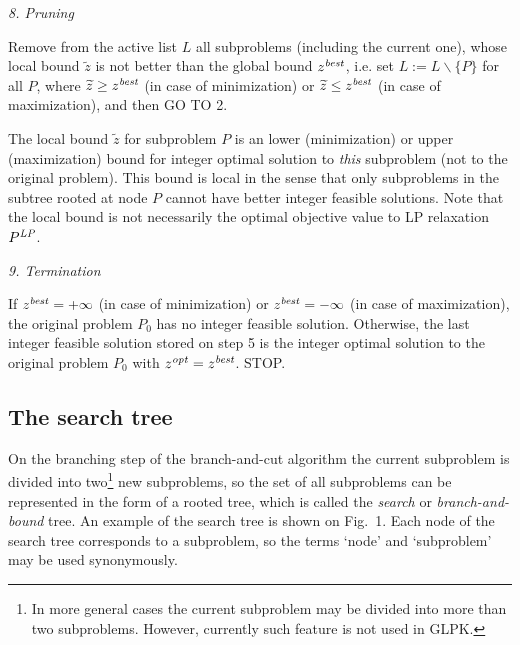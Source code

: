 {\it 8. Pruning}

Remove from the active list $L$ all subproblems (including the current
one), whose local bound $\widetilde{z}$ is not better than the global
bound $z^{\it best}$, i.e. set $L:=L\backslash\{P\}$ for all $P$, where
$\widetilde{z}\geq z^{\it best}$ (in case of minimization) or
$\widetilde{z}\leq z^{\it best}$ (in case of maximization), and then
GO TO 2.

The local bound $\widetilde{z}$ for subproblem $P$ is an lower
(minimization) or upper (maximization) bound for integer optimal
solution to {\it this} subproblem (not to the original problem). This
bound is local in the sense that only subproblems in the subtree rooted
at node $P$ cannot have better integer feasible solutions. Note that
the local bound is not necessarily the optimal objective value to LP
relaxation $P^{\it LP}$.

{\it 9. Termination}

If $z^{\it best}=+\infty$ (in case of minimization) or
$z^{\it best}=-\infty$ (in case of maximization), the original problem
$P_0$ has no integer feasible solution. Otherwise, the last integer
feasible solution stored on step 5 is the integer optimal solution to
the original problem $P_0$ with $z^{\it opt}=z^{\it best}$. STOP.

\subsection{The search tree}

On the branching step of the branch-and-cut algorithm the current
subproblem is divided into two\footnote{In more general cases the
current subproblem may be divided into more than two subproblems.
However, currently such feature is not used in GLPK.} new subproblems,
so the set of all subproblems can be represented in the form of a rooted
tree, which is called the {\it search} or {\it branch-and-bound} tree.
An example of the search tree is shown on Fig.~1. Each node of the
search tree corresponds to a subproblem, so the terms `node' and
`subproblem' may be used synonymously.

